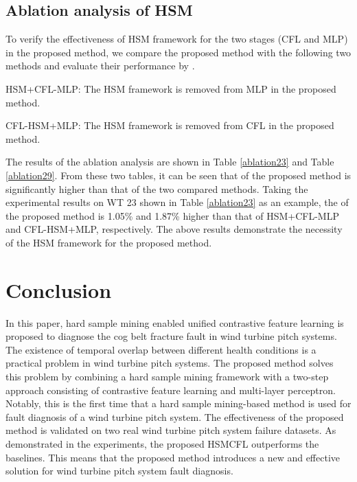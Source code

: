 \documentclass[lettersize,journal]{IEEEtran}
\begin{document}
\subsection{Ablation analysis of HSM}

To verify the effectiveness of HSM framework for the two stages (CFL and MLP) in the proposed method, 
we compare the proposed method with the following two methods and evaluate their performance by .

HSM+CFL-MLP: The HSM framework is removed from MLP in the proposed method.

CFL-HSM+MLP: The HSM framework is removed from CFL in the proposed method.

The results of the ablation analysis are shown in Table \ref{ablation23} and Table \ref{ablation29}. From these two tables, it can be seen that  of the proposed method is significantly higher than that of the two compared methods. Taking the experimental results on WT 23 shown in Table \ref{ablation23} as an example, the  of the proposed method is 1.05\% and 1.87\% higher than that of HSM+CFL-MLP and CFL-HSM+MLP, respectively. The above results demonstrate the necessity of the HSM framework for the proposed method. 



\section{Conclusion}

In this paper, hard sample mining enabled unified contrastive feature learning is proposed to diagnose the cog belt fracture fault in wind turbine pitch systems. The existence of temporal overlap between different health conditions is a practical problem in wind turbine pitch systems. The proposed method solves this problem by combining a hard sample mining framework with a two-step approach consisting of contrastive feature learning and multi-layer perceptron. Notably, this is the first time that a hard sample mining-based method is used for fault diagnosis of a wind turbine pitch system. The effectiveness of the proposed method is validated on two real wind turbine pitch system failure datasets. As demonstrated in the experiments, the proposed HSMCFL outperforms the baselines. This means that the proposed method introduces a new and effective solution for wind turbine pitch system fault diagnosis.

% 

\end{document}
